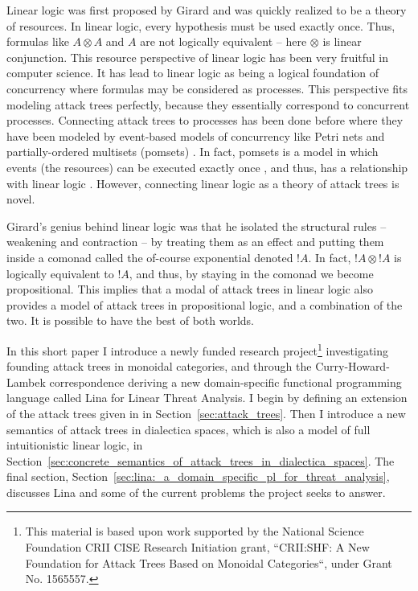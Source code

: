 \documentclass{llncs}
\begin{document}
Linear logic was first proposed by Girard \cite{?} and was quickly
realized to be a theory of resources.  In linear logic, every
hypothesis must be used exactly once.  Thus, formulas like $A \otimes
A$ and $A$ are not logically equivalent -- here $\otimes$ is linear
conjunction.  This resource perspective of linear logic has been very
fruitful in computer science.  It has lead to linear logic as being a
logical foundation of concurrency \cite{?} where formulas may be
considered as processes.  This perspective fits modeling attack trees
perfectly, because they essentially correspond to concurrent
processes.  Connecting attack trees to processes has been done before
where they have been modeled by event-based models of concurrency like
Petri nets and partially-ordered multisets (pomsets) \cite{?}.  In
fact, pomsets is a model in which events (the resources) can be
executed exactly once \cite{?}, and thus, has a relationship with
linear logic \cite{?}.  However, connecting linear logic as a theory
of attack trees is novel.

Girard's genius behind linear logic was that he isolated the
structural rules -- weakening and contraction -- by treating them as
an effect and putting them inside a comonad called the of-course
exponential denoted $!A$.  In fact, $!A \otimes !A$ is logically
equivalent to $!A$, and thus, by staying in the comonad we become
propositional.  This implies that a modal of attack trees in linear
logic also provides a model of attack trees in propositional logic,
and a combination of the two.  It is possible to have the best of both
worlds.

In this short paper I introduce a newly funded research
project\footnote{This material is based upon work supported by the
  National Science Foundation CRII CISE Research Initiation grant,
  ``CRII:SHF: A New Foundation for Attack Trees Based on Monoidal
  Categories``, under Grant No. 1565557.}  investigating founding
attack trees in monoidal categories, and through the
Curry-Howard-Lambek correspondence deriving a new domain-specific
functional programming language called Lina for Linear Threat
Analysis.  I begin by defining an extension of the attack trees given
in \cite{Jhawar:2015} in Section~\ref{sec:attack_trees}.  Then I
introduce a new semantics of attack trees in dialectica spaces, which
is also a model of full intuitionistic linear logic, in
Section~\ref{sec:concrete_semantics_of_attack_trees_in_dialectica_spaces}.
The final section,
Section~\ref{sec:lina:_a_domain_specific_pl_for_threat_analysis},
discusses Lina and some of the current problems the project seeks to
answer.
\end{document}
